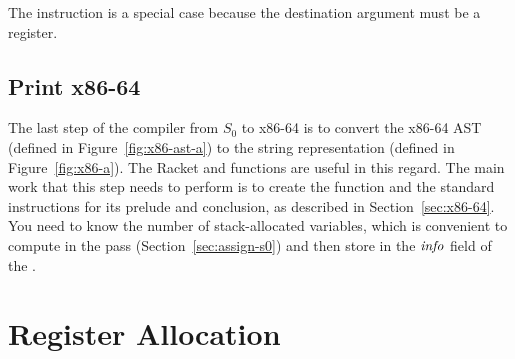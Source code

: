 \documentclass[12pt]{book}
\begin{document}
The  instruction is a special case because the destination
argument must be a register.

\section{Print x86-64}
\label{sec:print-x86}

The last step of the compiler from $S_0$ to x86-64 is to convert the
x86-64 AST (defined in Figure~\ref{fig:x86-ast-a}) to the string
representation (defined in Figure~\ref{fig:x86-a}). The Racket
 and  functions are useful in this
regard. The main work that this step needs to perform is to create the
 function and the standard instructions for its prelude
and conclusion, as described in Section~\ref{sec:x86-64}. You need to
know the number of stack-allocated variables, which is convenient to
compute in the  pass (Section~\ref{sec:assign-s0})
and then store in the $\mathit{info}$ field of the .




\chapter{Register Allocation}
\label{ch:register-allocation}
\end{document}
